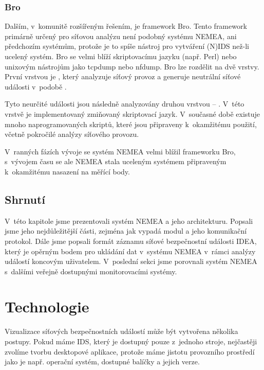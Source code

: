 \subsection*{Bro}
Dalším, v~komunitě rozšířeným řešením, je framework Bro. Tento framework primárně určený pro síťovou analýzu není podobný systému NEMEA, ani předchozím systémům, protože je to spíše nástroj pro vytváření (N)IDS než-li ucelený systém. Bro se velmi blíží skriptovacímu jazyku (např. Perl) nebo unixovým nástrojům jako tcpdump nebo nfdump. Bro lze rozdělit na dvě vrstvy. První vrstvou je , který analyzuje síťový provoz a generuje neutrální síťové události v~podobě . 

Tyto neurčité události jsou následně analyzovány druhou vrstvou -- . V~této vrstvě je implementovaný zmiňovaný skriptovací jazyk. V~současné době existuje mnoho naprogramovaných skriptů, které jsou připraveny k~okamžitému použití, včetně pokročilé analýzy síťového provozu.

V~ranných fázích vývoje se systém NEMEA velmi blížil frameworku Bro, s~vývojem času se ale NEMEA stala uceleným systémem připraveným k~okamžitému nasazení na měřící body.

\section{Shrnutí}

V~této kapitole jsme prezentovali systém NEMEA a jeho architekturu. Popsali jsme jeho nejdůležitější části, zejména jak vypadá modul a jeho komunikační protokol. Dále jsme popsali formát záznamu síťové bezpečnostní události IDEA, který je opěrným bodem pro ukládání dat v~systému NEMEA v~rámci analýzy událostí koncovým uživatelem. V~poslední sekci jsme porovnali systém NEMEA s~dalšími veřejně dostupnými monitorovacími systémy.


\chapter{Technologie}

Vizualizace síťových bezpečnostních událostí může být vytvořena několika postupy. Pokud máme IDS, který je dostupný pouze z~jednoho stroje, nejčastěji zvolíme tvorbu desktopové aplikace, protože máme jistotu provozního prostředí jako je např. operační systém, dostupné balíčky a jejich verze. 

